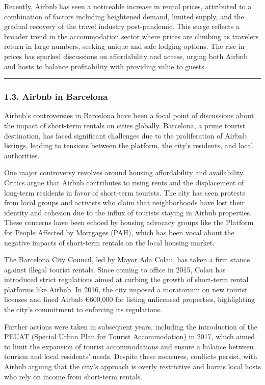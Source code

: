 \documentclass[
]{article}
\begin{document}
Recently, Airbnb has seen a noticeable increase in rental prices,
attributed to a combination of factors including heightened demand,
limited supply, and the gradual recovery of the travel industry
post-pandemic. This surge reflects a broader trend in the accommodation
sector where prices are climbing as travelers return in large numbers,
seeking unique and safe lodging options. The rise in prices has sparked
discussions on affordability and access, urging both Airbnb and hosts to
balance profitability with providing value to guests.

\begin{center}\rule{0.5\linewidth}{0.5pt}\end{center}

\hypertarget{airbnb-in-barcelona}{%
\subsubsection{1.3. Airbnb in Barcelona}\label{airbnb-in-barcelona}}

Airbnb's controversies in Barcelona have been a focal point of
discussions about the impact of short-term rentals on cities globally.
Barcelona, a prime tourist destination, has faced significant challenges
due to the proliferation of Airbnb listings, leading to tensions between
the platform, the city's residents, and local authorities.

One major controversy revolves around housing affordability and
availability. Critics argue that Airbnb contributes to rising rents and
the displacement of long-term residents in favor of short-term tourists.
The city has seen protests from local groups and activists who claim
that neighborhoods have lost their identity and cohesion due to the
influx of tourists staying in Airbnb properties. These concerns have
been echoed by housing advocacy groups like the Platform for People
Affected by Mortgages (PAH), which has been vocal about the negative
impacts of short-term rentals on the local housing market.

The Barcelona City Council, led by Mayor Ada Colau, has taken a firm
stance against illegal tourist rentals. Since coming to office in 2015,
Colau has introduced strict regulations aimed at curbing the growth of
short-term rental platforms like Airbnb. In 2016, the city imposed a
moratorium on new tourist licenses and fined Airbnb €600,000 for listing
unlicensed properties, highlighting the city's commitment to enforcing
its regulations.

Further actions were taken in subsequent years, including the
introduction of the PEUAT (Special Urban Plan for Tourist Accommodation)
in 2017, which aimed to limit the expansion of tourist accommodations
and ensure a balance between tourism and local residents' needs. Despite
these measures, conflicts persist, with Airbnb arguing that the city's
approach is overly restrictive and harms local hosts who rely on income
from short-term rentals.
\end{document}
